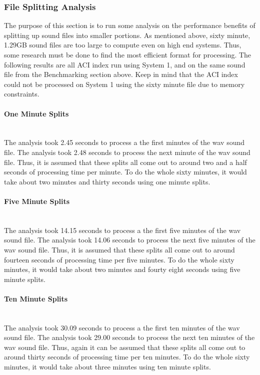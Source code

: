 \subsubsection{File Splitting Analysis}
The purpose of this section is to run some analysis on the performance benefits of splitting up sound files into smaller portions. As mentioned above, sixty minute, 1.29GB sound files are too large to compute even on high end systems. Thus, some research must be done to find the most efficient format for processing. The following results are all ACI index run using System 1, and on the same sound file from the Benchmarking section above. Keep in mind that the ACI index could not be processed on System 1 using the sixty minute file due to memory constraints.

\paragraph{One Minute Splits} \mbox{}\\[\paragraphheaderspace]
The analysis took 2.45 seconds to process a the first minutes of the wav sound file. The analysis took 2.48 seconds to process the next minute of the wav sound file. Thus, it is assumed that these splits all come out to around two and a half seconds of processing time per minute. To do the whole sixty minutes, it would take about two minutes and thirty seconds using one minute splits.

\paragraph{Five Minute Splits} \mbox{}\\[\paragraphheaderspace]
The analysis took 14.15 seconds to process a the first five minutes of the wav sound file. The analysis took 14.06 seconds to process the next five minutes of the wav sound file. Thus, it is assumed that these splits all come out to around fourteen seconds of processing time per five minutes. To do the whole sixty minutes, it would take about two minutes and fourty eight seconds using five minute splits.

\paragraph{Ten Minute Splits} \mbox{}\\[\paragraphheaderspace]
The analysis took 30.09 seconds to process a the first ten minutes of the wav sound file. The analysis took 29.00 seconds to process the next ten minutes of the wav sound file. Thus, again it can be assumed that these splits all come out to around thirty seconds of processing time per ten minutes. To do the whole sixty minutes, it would take about three minutes using ten minute splits.

